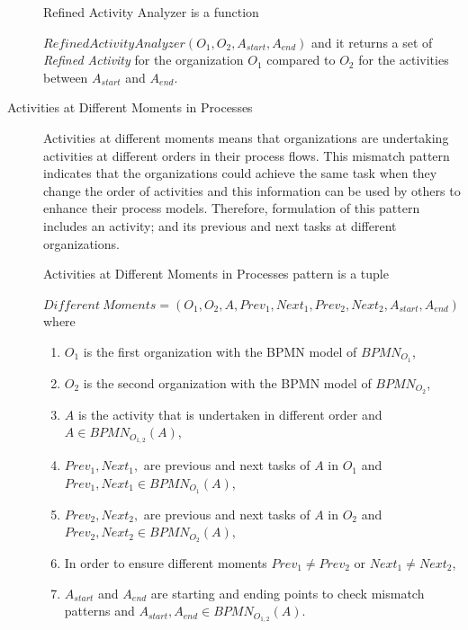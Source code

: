 \begin{description}
		\theoremstyle{definition}
		\begin{definition}
		Refined Activity Analyzer is a function 

		$RefinedActivityAnalyzer(O_{1}, O_{2}, A_{start}, A_{end})$ and it returns a set of \textit{Refined Activity} for the organization $O_{1}$ compared to $O_{2}$ for the activities between $A_{start}$ and $A_{end}$.
		\end{definition}

   \item[Activities at Different Moments in Processes] Activities at different moments means that organizations are undertaking activities at different orders in their process flows. This mismatch pattern indicates that the organizations could achieve the same task when they change the order of activities and this information can be used by others to enhance their process models. Therefore, formulation of this pattern includes an activity; and its previous and next tasks at different organizations.
		\theoremstyle{definition}
		\begin{definition}
		Activities at Different Moments in Processes pattern is a tuple 

		${Different\ Moments} = (O_{1}, O_{2}, A, Prev_{1}, Next_{1},Prev_{2}, Next_{2}, A_{start}, A_{end}) $ where 
		\begin{enumerate}
		  \item $O_{1}$ is the first organization with the BPMN model of $BPMN_{{O}_{1}}$,
		  \item $O_{2}$ is the second organization with the BPMN model of $BPMN_{{O}_{2}}$,
		  \item $A$ is the activity that is undertaken in different order and $A \in BPMN_{{O}_{1,2}}(A)$,
		  \item $Prev_{1}, Next_{1},$ are previous and next tasks of $A$ in $O_{1}$ and  $Prev_{1}, Next_{1} \in  BPMN_{{O}_{1}}(A)$,
  		  \item $Prev_{2}, Next_{2},$ are previous and next tasks of $A$ in $O_{2}$ and  $Prev_{2}, Next_{2} \in  BPMN_{{O}_{2}}(A)$,
  		  \item In order to ensure different moments $Prev_{1} \neq Prev_{2}$ or $Next_{1} \neq Next_{2}$,
 		  \item $A_{start}$ and $A_{end}$ are starting and ending points to check mismatch patterns and $A_{start}, A_{end} \in BPMN_{{O}_{1,2}}(A)$. 
		\end{enumerate}
		\end{definition}


\end{description}
